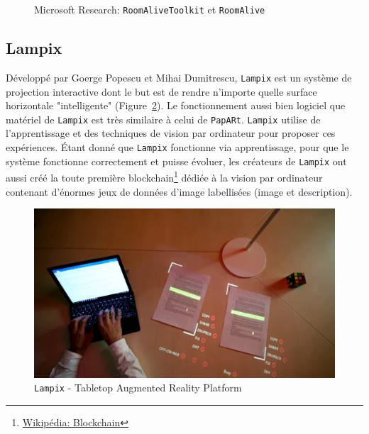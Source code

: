 \begin{figure}[H]
    \centering
\caption{Microsoft Research: \texttt{RoomAliveToolkit} et \texttt{RoomAlive}\protect\footnotemark}
\label{fig:roomalive}
\end{figure}

\subsection{Lampix} 
Développé par Goerge Popescu et Mihai Dumitrescu, \texttt{Lampix} est un système de projection interactive dont le but est de rendre n'importe quelle surface horizontale "intelligente" (Figure~\ref{fig:lampix}). Le fonctionnement aussi bien logiciel que matériel de \texttt{Lampix} est très similaire à celui de \texttt{\texttt{PapARt}}. \texttt{Lampix} utilise de l'apprentissage et des techniques de vision par ordinateur pour proposer ces expériences. Étant donné que \texttt{Lampix} fonctionne via apprentissage, pour que le système fonctionne correctement et puisse évoluer, les créateurs de \texttt{Lampix} ont aussi créé la toute première blockchain\footnote{\href{https://fr.wikipedia.org/wiki/Blockchain}{Wikipédia: Blockchain}} dédiée à la vision par ordinateur contenant d'énormes jeux de données d'image labellisées (image et description).
     
\begin{figure}[H]
\centering
\includegraphics[width=0.7\linewidth]{images/lampix}
\caption{\texttt{Lampix} - Tabletop Augmented Reality Platform\protect\footnotemark}
\label{fig:lampix}
\end{figure} 

